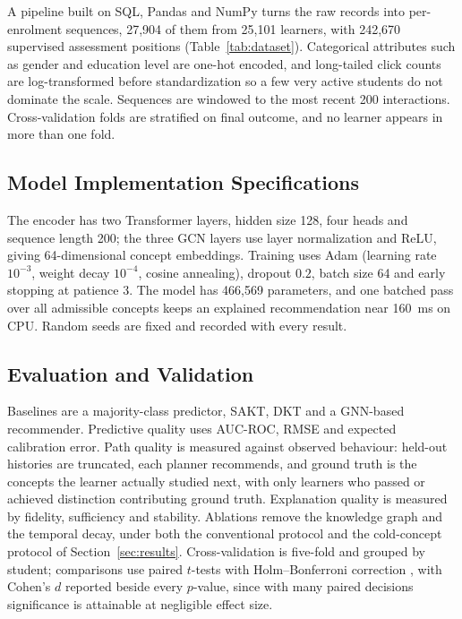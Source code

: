\documentclass[conference]{IEEEtran}
\begin{document}
A pipeline built on SQL, Pandas and NumPy turns the raw records into per-enrolment
sequences, 27{,}904 of them from 25{,}101 learners, with 242{,}670 supervised assessment positions
(Table~\ref{tab:dataset}). Categorical attributes such as gender and education level are
one-hot encoded, and long-tailed click counts are log-transformed before standardization so
a few very active students do not dominate the scale. Sequences are windowed to the most
recent 200 interactions. Cross-validation folds are stratified on final outcome, and no
learner appears in more than one fold.



\subsection{Model Implementation Specifications}

The encoder has two Transformer layers, hidden size 128, four heads
and sequence length 200; the three GCN layers use layer normalization and ReLU, giving
64-dimensional concept embeddings. Training uses Adam (learning rate $10^{-3}$, weight decay
$10^{-4}$, cosine annealing), dropout $0.2$, batch size 64 and early stopping at patience 3.
The model has 466{,}569 parameters, and one batched pass over all admissible concepts keeps
an explained recommendation near 160~ms on CPU. Random seeds are fixed and recorded with
every result.

\subsection{Evaluation and Validation}

Baselines are a majority-class predictor, SAKT, DKT and a GNN-based recommender. Predictive
quality uses AUC-ROC, RMSE and expected calibration error. Path quality is measured against
observed behaviour: held-out histories are truncated, each planner recommends, and ground
truth is the concepts the learner actually studied next, with only learners who passed or
achieved distinction contributing ground truth. Explanation quality is measured by
fidelity, sufficiency and stability. Ablations remove the knowledge graph and the temporal
decay, under both the conventional protocol and the cold-concept protocol of
Section~\ref{sec:results}. Cross-validation is five-fold and
grouped by student; comparisons use paired $t$-tests with Holm--Bonferroni correction
\cite{holm1979}, with Cohen's $d$ reported beside every $p$-value, since with many paired
decisions significance is attainable at negligible effect size.
\end{document}
